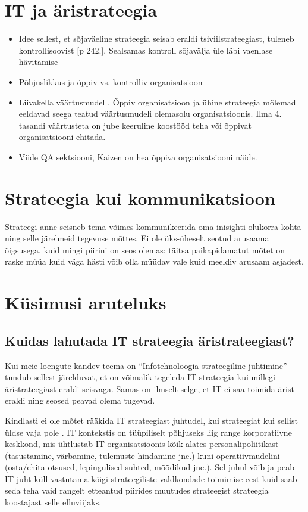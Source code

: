 \section{IT ja äristrateegia}
\begin{itemize}
	\item Idee sellest, et sõjaväeline strateegia seisab eraldi tsiviilstrateegiast, tuleneb kontrollisoovist \cite{freedman2013strategy} [p 242.]. Sealsamas kontroll sõjavälja üle läbi vaenlase hävitamise
	\item Põhjuslikkus ja õppiv vs. kontrolliv organisatsioon \cite{senge19905th}
	\item Liivakella väärtusmudel \cite{hing}.\cite{barrett2013liberating} Õppiv organisatsioon ja ühine strateegia mõlemad eeldavad seega teatud väärtusmudeli olemasolu organisatsioonis. Ilma 4. tasandi väärtusteta on jube keeruline koostööd teha või õppivat organisatsiooni ehitada. 
	\item Viide QA sektsiooni, Kaizen on hea õppiva organisatsiooni näide.
\end{itemize}

\section{Strateegia kui kommunikatsioon}
Strateegi anne seisneb tema võimes kommunikeerida oma inisighti olukorra kohta ning selle järelmeid tegevuse mõttes. Ei ole üks-üheselt seotud arusaama õigsusega, kuid mingi piirini on seos olemas: täitsa paikapidamatut mõtet on raske müüa kuid väga hästi võib olla müüdav vale kuid meeldiv arusaam asjadest.

\section{Küsimusi aruteluks}
\subsection{Kuidas lahutada IT strateegia äristrateegiast?}
\label{sec:strategy:q1}
Kui meie loengute kandev teema on \enquote{Infotehnoloogia strateegiline juhtimine} tundub sellest järelduvat, et on võimalik tegeleda IT strateegia kui millegi äristrateegiast eraldi seisvaga. Samas on ilmselt selge, et IT ei saa toimida ärist eraldi ning seosed peavad olema tugevad.

Kindlasti ei ole mõtet rääkida IT strateegiast juhtudel, kui strateegiat kui sellist üldse vaja pole . IT kontekstis on tüüpiliselt põhjuseks liig range korporatiivne keskkond, mis ühtlustab IT organisatsioonis kõik alates personalipoliitikast (tasustamine, värbamine, tulemuste hindamine jne.) kuni operatiivmudelini (osta/ehita otsused, lepingulised suhted, mõõdikud jne.). Sel juhul võib ja peab IT-juht küll vastutama kõigi strateegiliste valdkondade toimimise eest kuid saab seda teha vaid rangelt etteantud piirides muutudes strateegist strateegia koostajast selle elluviijaks.

